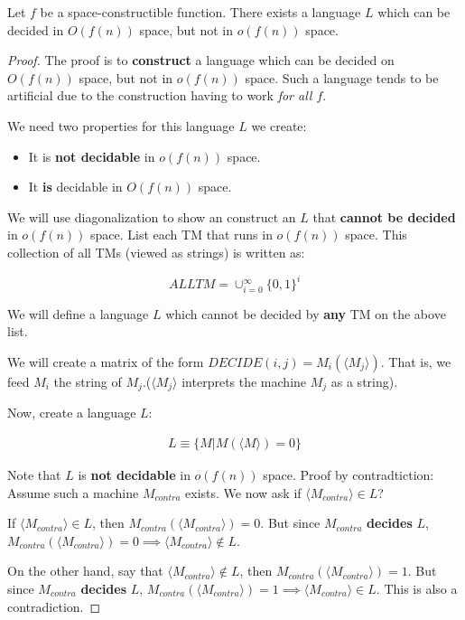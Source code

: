 \begin{theorem}
Let $f$ be a space-constructible function. There exists a language $L$ which
can be decided in $O(f(n))$ space, but not in $o(f(n))$ space.
\end{theorem}
\begin{proof}
The proof is to \textbf{construct} a language which can be decided on $O(f(n))$
space, but not in $o(f(n))$ space. Such a language tends to be artificial due
to the construction having to work \textit{for all $f$}.

We need two properties for this language $L$ we create:

\begin{itemize}
\item It is \textbf{not decidable} in $o(f(n))$ space.
\item It \textbf{is} decidable in $O(f(n))$ space.
\end{itemize}

We will use diagonalization to show an construct an $L$ that 
\textbf{cannot be decided} in $o(f(n))$ space. List each TM that runs in 
$o(f(n))$ space. This collection of all TMs (viewed as strings) is written as:

$$ALLTM = \cup_{i=0}^\infty \{0, 1\}^i$$


We will define a language $L$ which cannot be decided by \textbf{any} TM
on the above list.

We will create a matrix of the form $DECIDE(i, j) = M_i(\langle M_j \rangle)$.
That is, we feed $M_i$ the string of $M_j$.($\langle M_j \rangle$ interprets
the machine $M_j$ as a string).

Now, create a language $L$:

\begin{align*}
L \equiv \{ M \vert M ( \langle M \rangle ) = 0 \}
\end{align*}

Note that $L$ is \textbf{not decidable} in $o(f(n))$ space. Proof by contradtiction:
Assume such a machine $M_{contra}$ exists. We now ask if $\langle M_{contra} \rangle \in L$?

If $\langle M_{contra} \rangle \in L$, then $M_{contra} (\langle M_{contra} \rangle) = 0$.
But since $M_{contra}$ \textbf{decides} $L$,
$M_{contra} (\langle M_{contra} \rangle) = 0 \implies  \langle M_{contra} \rangle \notin L$.

On the other hand, say that $\langle M_{contra} \rangle \notin L$, then $M_{contra} (\langle M_{contra} \rangle) = 1$.
But since $M_{contra}$ \textbf{decides} $L$, $M_{contra} (\langle M_{contra} \rangle) = 1 \implies \langle M_{contra} \rangle \in L$. This is also a contradiction.

\end{proof}


